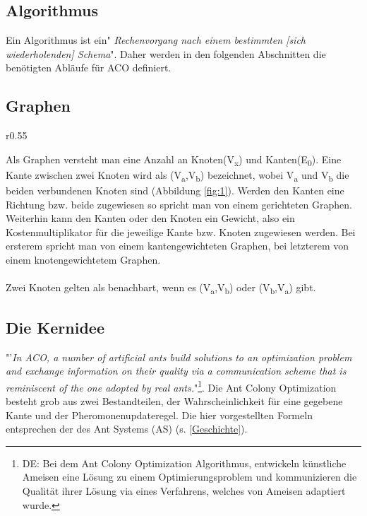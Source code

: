 \documentclass[12pt]{article}
\begin{document}
\subsection{Algorithmus}
Ein Algorithmus ist ein"\textit{ Rechenvorgang nach einem bestimmten [sich wiederholenden] Schema}"\cite{duden_algo}. Daher werden in den folgenden Abschnitten die benötigten Abläufe für ACO definiert.
\subsection{Graphen}
\begin{wrapfigure}{r}{0.55\textwidth}
\centering
{}
\caption{Einfacher Graph}
\label{fig:1}
\end{wrapfigure}
Als Graphen versteht man eine Anzahl an Knoten(V\textsubscript{x}) und Kanten(E\textsubscript{0}). Eine Kante zwischen zwei Knoten wird als (V\textsubscript{a},V\textsubscript{b}) bezeichnet, wobei V\textsubscript{a} und V\textsubscript{b} die beiden verbundenen Knoten sind (Abbildung \ref{fig:1}). Werden den Kanten eine Richtung bzw. beide zugewiesen so spricht man von einem gerichteten Graphen. Weiterhin kann den Kanten oder den Knoten ein Gewicht, also ein Kostenmultiplikator für die jeweilige Kante bzw. Knoten zugewiesen werden. Bei ersterem spricht man von einem kantengewichteten Graphen, bei letzterem von einem knotengewichtetem Graphen.\\\\
Zwei Knoten gelten als benachbart, wenn es (V\textsubscript{a},V\textsubscript{b}) oder (V\textsubscript{b},V\textsubscript{a}) gibt.
\subsection{Die Kernidee}\label{Kernidee}
"'\textit{In ACO, a number of artificial ants build solutions to an optimization problem and exchange information on their quality via a communication scheme that is reminiscent of the one adopted by real ants.}"\cite{ dorigo2007ant}\footnote{DE: Bei dem Ant Colony Optimization Algorithmus, entwickeln künstliche Ameisen eine Lösung zu einem Optimierungsproblem und kommunizieren die Qualität ihrer Lösung via eines Verfahrens, welches von Ameisen adaptiert wurde.  }. 
Die Ant Colony Optimization besteht grob aus zwei Bestandteilen, der Wahrscheinlichkeit für eine gegebene Kante und der Pheromonenupdateregel. Die hier vorgestellten Formeln entsprechen der des Ant Systems (AS) (s. \ref{Geschichte}).
\end{document}

